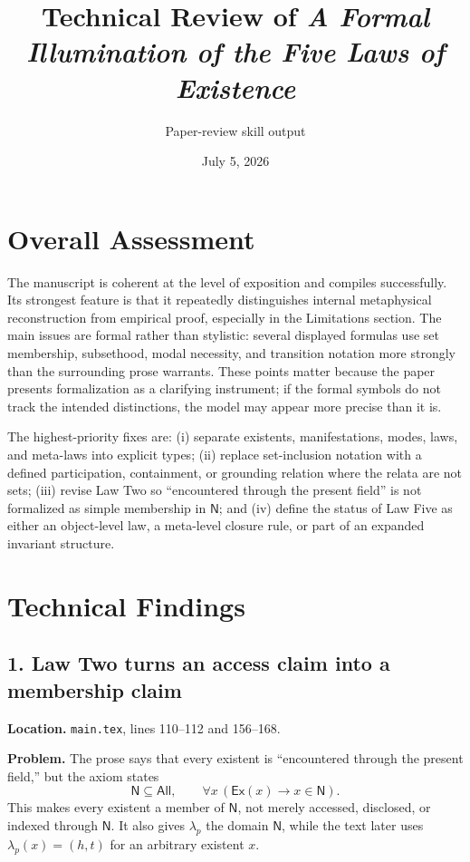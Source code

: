 \documentclass[11pt]{article}
\title{Technical Review of \emph{A Formal Illumination of the Five Laws of Existence}}
\author{Paper-review skill output}
\date{July 5, 2026}
\newcommand{\Ex}{\mathsf{Ex}}
\newcommand{\Now}{\mathsf{N}}
\newcommand{\All}{\mathsf{All}}
\begin{document}
\maketitle

\section*{Overall Assessment}

The manuscript is coherent at the level of exposition and compiles successfully. Its strongest feature is that it repeatedly distinguishes internal metaphysical reconstruction from empirical proof, especially in the Limitations section. The main issues are formal rather than stylistic: several displayed formulas use set membership, subsethood, modal necessity, and transition notation more strongly than the surrounding prose warrants. These points matter because the paper presents formalization as a clarifying instrument; if the formal symbols do not track the intended distinctions, the model may appear more precise than it is.

The highest-priority fixes are: (i) separate existents, manifestations, modes, laws, and meta-laws into explicit types; (ii) replace set-inclusion notation with a defined participation, containment, or grounding relation where the relata are not sets; (iii) revise Law Two so ``encountered through the present field'' is not formalized as simple membership in $\Now$; and (iv) define the status of Law Five as either an object-level law, a meta-level closure rule, or part of an expanded invariant structure.

\section*{Technical Findings}

\subsection*{1. Law Two turns an access claim into a membership claim}

\textbf{Location.} \texttt{main.tex}, lines 110--112 and 156--168.

\textbf{Problem.} The prose says that every existent is ``encountered through the present field,'' but the axiom states
\[
\Now\subseteq\All,
\qquad
\forall x\,(\Ex(x)\rightarrow x\in\Now).
\]
This makes every existent a member of $\Now$, not merely accessed, disclosed, or indexed through $\Now$. It also gives $\lambda_p$ the domain $\Now$, while the text later uses $\lambda_p(x)=(h,t)$ for an arbitrary existent $x$.
\end{document}
